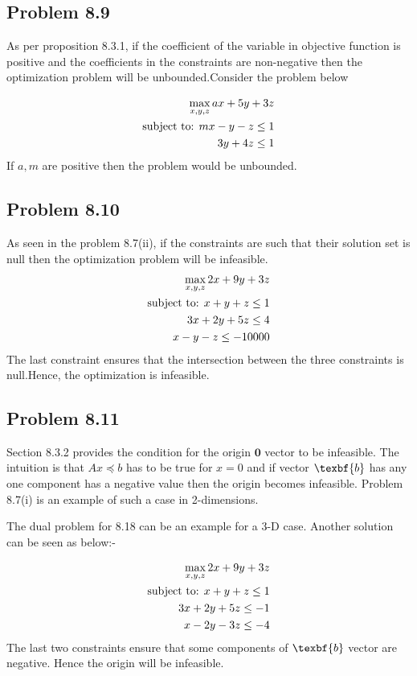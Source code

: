 \documentclass[letterpaper,12pt]{article}
\theoremstyle{definition}
\begin{document}
\subsection*{Problem 8.9 }

As per proposition 8.3.1, if the coefficient of the variable in objective function is positive and the coefficients in the constraints are non-negative then the optimization problem will be unbounded.Consider the problem below

\begin{align*}
  \max_{{x,y,z}} ax+ 5y+ 3z\\
  \textnormal{subject to: } mx -y-z\leq 1\\
   3y+4z\leq 1\\
\end{align*}
If $a,m$ are positive then the problem would be unbounded.
\subsection*{Problem 8.10 }
As seen in the problem 8.7(ii), if the constraints are such that their solution set is null then the optimization problem will be infeasible.
\begin{align*}
  \max_{{x,y,z}} 2x+ 9y+ 3z\\
  \textnormal{subject to: } x + y + z\leq 1\\
   3x + 2y+ 5z\leq 4 \\
   x - y- z\leq -10000
\end{align*}
The last constraint ensures that the intersection between the three constraints is null.Hence, the optimization is infeasible. 


\subsection*{Problem 8.11 }
Section 8.3.2 provides the condition for the origin $\textbf{0}$ vector to be infeasible. The intuition is that $Ax\preceq b$ has to be true for $x=0$ and if vector $\texbf{b}$ has any one component has a negative value then the origin becomes infeasible. Problem 8.7(i) is an example of such a case in 2-dimensions.

The dual problem for 8.18 can be an example for a 3-D case. Another solution can be seen as below:-

\begin{align*}
  \max_{{x,y,z}} 2x+ 9y+ 3z\\
  \textnormal{subject to: } x + y + z\leq 1\\
   3x + 2y+ 5z\leq -1 \\
   x - 2y -3z\leq -4
\end{align*}
The last two constraints ensure that some components of $\texbf{b}$  vector are negative. Hence the origin will be infeasible.
\end{document}
